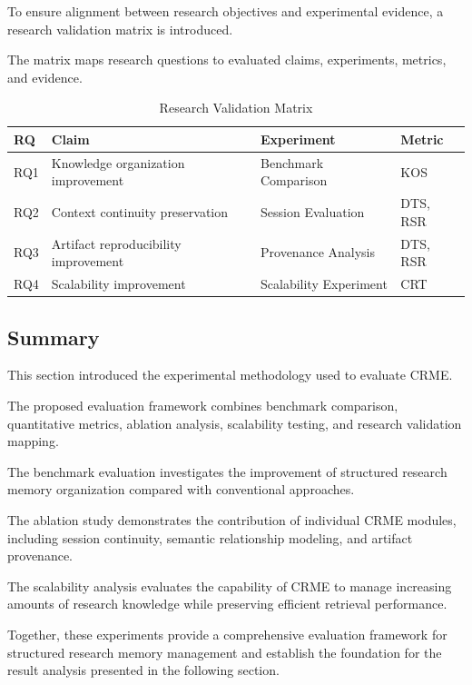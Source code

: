 To ensure alignment between research objectives and experimental evidence, a research validation matrix is introduced.

The matrix maps research questions to evaluated claims, experiments, metrics, and evidence.


\begin{table}[h]

\centering

\caption{Research Validation Matrix}

\label{tab:validation_matrix}


\begin{tabular}{p{2cm}p{3cm}p{3cm}p{2cm}}

\hline

RQ & Claim & Experiment & Metric\\

\hline


RQ1 &
Knowledge organization improvement &
Benchmark Comparison &
KOS
\\


RQ2 &
Context continuity preservation &
Session Evaluation &
DTS, RSR
\\


RQ3 &
Artifact reproducibility improvement &
Provenance Analysis &
DTS, RSR
\\


RQ4 &
Scalability improvement &
Scalability Experiment &
CRT
\\


\hline

\end{tabular}

\end{table}



\subsection{Summary}

This section introduced the experimental methodology used to evaluate CRME.

The proposed evaluation framework combines benchmark comparison, quantitative metrics, ablation analysis, scalability testing, and research validation mapping.

The benchmark evaluation investigates the improvement of structured research memory organization compared with conventional approaches.

The ablation study demonstrates the contribution of individual CRME modules, including session continuity, semantic relationship modeling, and artifact provenance.

The scalability analysis evaluates the capability of CRME to manage increasing amounts of research knowledge while preserving efficient retrieval performance.

Together, these experiments provide a comprehensive evaluation framework for structured research memory management and establish the foundation for the result analysis presented in the following section.

